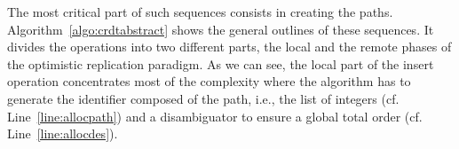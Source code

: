 
%   


The most critical part of such sequences consists in creating the
paths. Algorithm~\ref{algo:crdtabstract} shows the general outlines of these
sequences. It divides the operations into two different parts, the local and the
remote phases of the optimistic replication paradigm. As we can see, the local
part of the insert operation concentrates most of the complexity where the
algorithm has to generate the identifier composed of the path, i.e., the list of
integers (cf. Line~\ref{line:allocpath}) and a disambiguator to ensure a global
total order (cf. Line~\ref{line:allocdes}).


